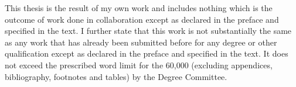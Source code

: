 \begin{declaration}
This thesis is the result of my own work and includes nothing which is the outcome of work done in collaboration except as declared in the preface and specified in the text. I further state that this work is not substantially the same as any work that has already been submitted before for any degree or other qualification except as declared in the preface and specified in the text. It does not exceed the prescribed word limit for the 60,000 (excluding appendices, bibliography, footnotes and tables) by the Degree Committee.



\end{declaration}